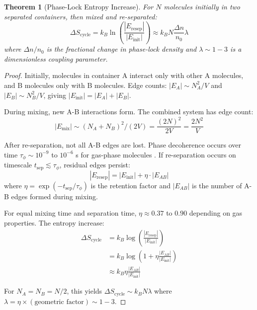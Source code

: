 \documentclass[superscriptaddress,prb,10pt]{revtex4-2}
\newtheorem{theorem}{Theorem}
\theoremstyle{definition}
\theoremstyle{remark}
\begin{document}
\begin{theorem}[Phase-Lock Entropy Increase]
\label{thm:phase_lock_entropy}
For $N$ molecules initially in two separated containers, then mixed and re-separated:
\begin{equation}
\Delta S_{\text{cycle}} = k_B \ln\left(\frac{|E_{\text{resep}}|}{|E_{\text{init}}|}\right) \approx k_B N \frac{\Delta n}{n_0} \lambda
\end{equation}
where $\Delta n / n_0$ is the fractional change in phase-lock density and $\lambda \sim 1-3$ is a dimensionless coupling parameter.
\end{theorem}

\begin{proof}
Initially, molecules in container A interact only with other A molecules, and B molecules only with B molecules. Edge counts: $|E_A| \sim N_A^2 / V$ and $|E_B| \sim N_B^2 / V$, giving $|E_{\text{init}}| = |E_A| + |E_B|$.

During mixing, new A-B interactions form. The combined system has edge count:
\begin{equation}
|E_{\text{mix}}| \sim (N_A + N_B)^2 / (2V) = \frac{(2N)^2}{2V} = \frac{2N^2}{V}
\end{equation}

After re-separation, not all A-B edges are lost. Phase decoherence occurs over time $\tau_{\phi} \sim 10^{-9}$ to $10^{-6}$ s for gas-phase molecules \cite{plenio2013}. If re-separation occurs on timescale $t_{\text{sep}} \lesssim \tau_{\phi}$, residual edges persist:
\begin{equation}
|E_{\text{resep}}| = |E_{\text{init}}| + \eta \cdot |E_{AB}|
\end{equation}
where $\eta = \exp(-t_{\text{sep}}/\tau_{\phi})$ is the retention factor and $|E_{AB}|$ is the number of A-B edges formed during mixing.

For equal mixing time and separation time, $\eta \approx 0.37$ to $0.90$ depending on gas properties. The entropy increase:
\begin{align}
\Delta S_{\text{cycle}} &= k_B \log\left(\frac{|E_{\text{resep}}|}{|E_{\text{init}}|}\right) \\
&= k_B \log\left(1 + \eta \frac{|E_{AB}|}{|E_{\text{init}}|}\right) \\
&\approx k_B \eta \frac{|E_{AB}|}{|E_{\text{init}}|}
\end{align}

For $N_A = N_B = N/2$, this yields $\Delta S_{\text{cycle}} \sim k_B N \lambda$ where $\lambda = \eta \times (\text{geometric factor}) \sim 1-3$.
\end{proof}
\end{document}
